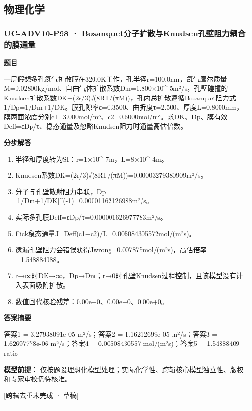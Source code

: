 \documentclass[UTF8,11pt,a4paper]{ctexart}
\begin{document}
\subsection*{物理化学}
\subsubsection*{UC-ADV10-P98 · Bosanquet分子扩散与Knudsen孔壁阻力耦合的膜通量}
\noindent\textbf{题目}\par
一层假想多孔氮气扩散膜在320.0K工作，孔半径r=100.0nm，氮气摩尔质量M=0.02800kg/mol、自由气体扩散系数Dm=1.800×10\textasciicircum{}-5m²/s。孔壁碰撞的Knudsen扩散系数DK=(2r/3)√(8RT/(πM))，孔内总扩散遵循Bosanquet阻力式1/Dp=1/Dm+1/DK。膜孔隙率ε=0.3500、曲折度τ=2.500、厚度L=0.8000mm，膜两面浓度分别c1=3.000mol/m³、c2=0.5000mol/m³。求DK、Dp、膜有效Deff=εDp/τ、稳态通量及忽略Knudsen阻力时通量高估倍数。\par
\medskip\noindent\textbf{分步解答}
\begin{enumerate}
\item 半径和厚度转为SI：r=1×10\textasciicircum{}-7m，L=8×10\textasciicircum{}-4m。
\item Knudsen系数DK=(2r/3)√(8RT/(πM))=0.00003279380909m²/s。
\item 分子与孔壁散射阻力串联，Dp=[1/Dm+1/DK]\textasciicircum{}(-1)=0.00001162126988m²/s。
\item 实际多孔膜Deff=εDp/τ=0.000001626977783m²/s。
\item Fick稳态通量J=Deff(c1−c2)/L=0.005084305572mol/(m²s)。
\item 遗漏孔壁阻力会错误获得Jwrong=0.007875mol/(m²s)，高估倍率=1.548884088。
\item r→∞时DK→∞，Dp→Dm；r→0时孔壁Knudsen过程控制，且该模型没有计入表面吸附扩散。
\item 数值回代核验残差：0.00e+0、0.00e+0、0.00e+0。
\end{enumerate}
\noindent\textbf{答案摘要}\par
答案1 = 3.27938091e-05 m²/s；答案2 = 1.16212699e-05 m²/s；答案3 = 1.62697778e-06 m²/s；答案4 = 0.00508430557 mol/(m²s)；答案5 = 1.54888409 ratio\par
\noindent\textbf{模型前提：}
仅按题设理想化模型处理；实际化学性、跨辑核心模型独立性、版权和专家审校仍待核准。\par
\noindent\textcolor{red!65!black}{[跨辑去重未完成 · 草稿]} \par
\medskip\hrule\medskip
{}
\end{document}
